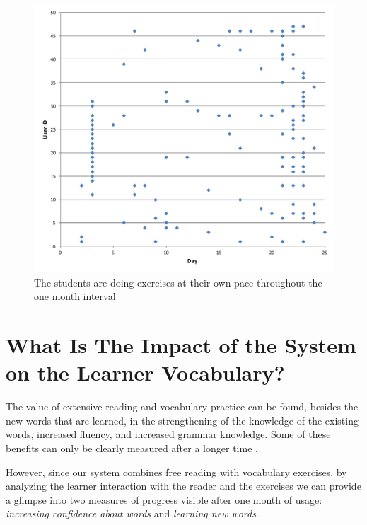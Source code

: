   \begin{figure}[h!]
  \centering
    \includegraphics[width=0.8\columnwidth]{figures/user_exercise_activity_vs_day.pdf}
    \caption{The students are doing exercises at their own pace throughout the one month interval }
    \label{fig:activity_per_day}
  \end{figure}






\newpage
\section{What Is The Impact of the System on the Learner Vocabulary?}

  The value of extensive reading and vocabulary practice can be found, besides the new words that are learned, in the strengthening of the knowledge of the existing words, increased fluency, and increased grammar knowledge. Some of these benefits can only be clearly measured after a longer time \cite{renadya07-power}. 

  However, since our system combines free reading with vocabulary exercises, by analyzing the learner interaction with the reader and the exercises we can provide a glimpse into two measures of progress visible after one month of usage: {\em increasing confidence about words} and {\em learning new words}. 

